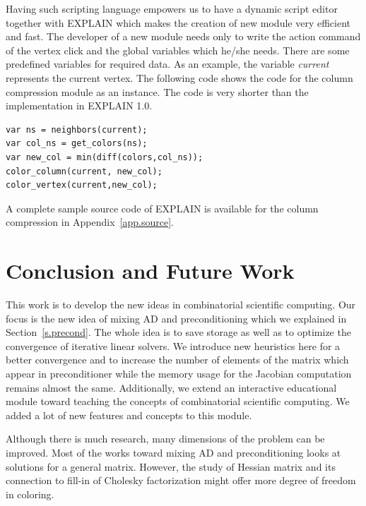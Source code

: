 \documentclass[11pt, twoside,a4paper]{book}
\newcommand{\secref}[1]{Section~\protect\ref{#1}}
\newcommand{\appref}[1]{Appendix~\protect\ref{#1}}
\begin{document}
Having such scripting language empowers us to have a dynamic script editor
together with EXPLAIN which makes the creation of new module very efficient and fast.
The developer of a new module needs only to write the action command of the vertex
click and the global variables which he/she needs.
There are some predefined variables for required data.
As an example, the variable \textit{current} represents the current vertex.
The following code shows the code for the column compression
module as an instance. The code is very shorter than the implementation in EXPLAIN 1.0.
\begin{lstlisting}
var ns = neighbors(current);
var col_ns = get_colors(ns);
var new_col = min(diff(colors,col_ns));
color_column(current, new_col);
color_vertex(current,new_col);
\end{lstlisting}
A complete sample source code of EXPLAIN is available for the column compression
in \appref{app.source}.


\chapter{Conclusion and Future Work}
\label{conc}
This work is to develop the new ideas in combinatorial scientific
computing. Our focus is the new idea of mixing AD and preconditioning which we explained in \secref{s.precond}. The whole idea is to save storage as well as to optimize the convergence of iterative linear solvers. We introduce new heuristics here for a better convergence and to increase the number of elements of the matrix which appear in preconditioner while the memory usage for the Jacobian computation
remains almost the same. Additionally, we extend an interactive educational module toward teaching the concepts of combinatorial scientific computing. We added a lot of new features and concepts to this module.

Although there is much research, many dimensions of the problem can be improved. Most of the works toward mixing AD and preconditioning looks at solutions for a general matrix. However, the study of Hessian matrix and its connection to fill-in of Cholesky factorization might offer more degree of freedom in coloring.
\end{document}
